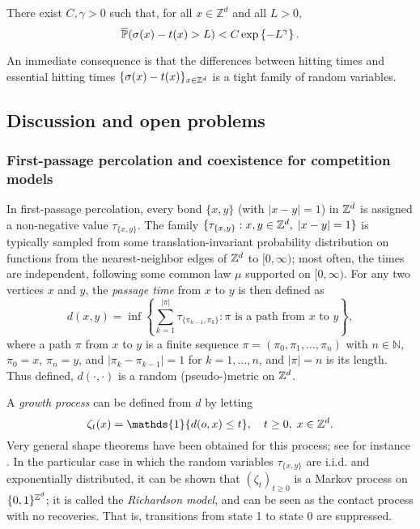 \begin{proposition}\label{propEssTightness}
	There exist $C,\gamma > 0$ such that, for all $x \in \mathbb{Z}^d$ and all $L > 0$,
$$\overline{\mathbb{P}}(\sigma(x) - t(x) > L) < C\exp\left\{-L^\gamma\right\}.$$
\end{proposition}
An immediate consequence is that the differences between hitting times and essential hitting times $\{\sigma(x)-t(x)\}_{x\in{\mathbb{Z}^d}}$ is a tight family of random variables. 

\subsection{Discussion and open problems}
\subsubsection{First-passage percolation and coexistence for competition models} 


In first-passage percolation, every bond $\{x,y\}$ (with $|x-y|=1$) in ${\mathbb{Z}^d}$ is assigned a non-negative value $\tau_{\{x,y\}}$. The family $\{\tau_{\{x,y\}}:x,y\in{\mathbb{Z}^d},\;|x-y|=1\}$  is typically sampled from some translation-invariant probability distribution on functions from the nearest-neighbor edges of ${\mathbb{Z}^d}$ to $[0,\infty)$; most often, the times are independent, following some common law $\mu$ supported on $[0,\infty)$. For any two vertices $x$ and $y$, the \textit{passage time} from $x$ to $y$ is then defined as
\begin{equation}\label{eq:random_metric} d(x,y)=\inf\left\{\sum_{k=1}^{|\pi|}\tau_{\{\pi_{k-1},\pi_k\}}:\pi\text{ is a path from $x$ to $y$}\right\}, \end{equation} 
where a path $\pi$ from $x$ to $y$ is a finite sequence $\pi=(\pi_0,\pi_1,\dots,\pi_n)$ with $n\in\mathbb N$, $\pi_0=x$, $\pi_n=y$, and $|\pi_k-\pi_{k-1}|=1$ for $k=1,\dots,n$, and  $|\pi| = n$ is its length. Thus defined, $d(\cdot,\cdot)$ is a random (pseudo-)metric on ${\mathbb{Z}^d}$.

A \textit{growth process} can be defined from $d$ by letting
\begin{equation}\label{eq:growth_process}
\zeta_t(x) = \mathds{1}\{d(o,x) \leq t \},\quad t \geq 0,\; x \in \Zd.
\end{equation}
Very general shape theorems have been obtained for this process; see for instance \cite{GaretMarch12}. In the particular case in which the random variables $\tau_{\{x,y\}}$ are i.i.d. and exponentially distributed, it can be shown that $(\zeta_t)_{t \geq 0}$ is a Markov process on $\{0,1\}^{\mathbb{Z}^d}$; it is called the \textit{Richardson model}, and can be seen as the contact process with no recoveries. That is, transitions from state 1 to state 0 are suppressed.

